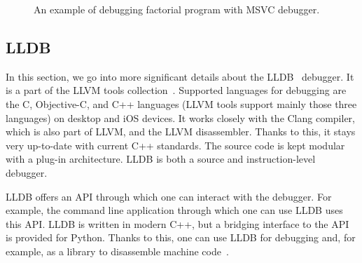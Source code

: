 \begin{figure}
    \caption{An example of debugging factorial program with MSVC debugger.}
    \label{fig:msvc}
\end{figure}

\subsection{LLDB}\label{section:case-study}
In this section, we go into more significant details about the LLDB~\cite{lldb}
debugger. It is a part of the LLVM tools collection~\cite{llvm}. Supported
languages for debugging are the C, Objective-C, and C++ languages (LLVM tools
support mainly those three languages) on desktop and iOS devices. It works
closely with the Clang compiler, which is also part of LLVM, and the LLVM
disassembler. Thanks to this, it stays very up-to-date with current C++
standards. The source code is kept modular with a plug-in architecture. LLDB is
both a source and instruction-level debugger.

LLDB offers an API through which one can interact with the debugger. For
example, the command line application through which one can use LLDB uses this
API. LLDB is written in modern C++, but a bridging interface to the API is
provided for Python. Thanks to this, one can use LLDB for debugging and, for
example, as a library to disassemble machine code~\cite{lldb}.

